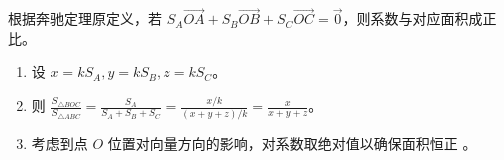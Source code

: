 \begin{proofbox}
根据奔驰定理原定义，若 $S_A \vec{OA} + S_B \vec{OB} + S_C \vec{OC} = \vec{0}$，则系数与对应面积成正比。
\begin{enumerate}
    \item 设 $x=kS_A, y=kS_B, z=kS_C$。
    \item 则 $\frac{S_{\triangle BOC}}{S_{\triangle ABC}} = \frac{S_A}{S_A+S_B+S_C} = \frac{x/k}{(x+y+z)/k} = \frac{x}{x+y+z}$。
    \item 考虑到点 $O$ 位置对向量方向的影响，对系数取绝对值以确保面积恒正 。
\end{enumerate}
\end{proofbox}